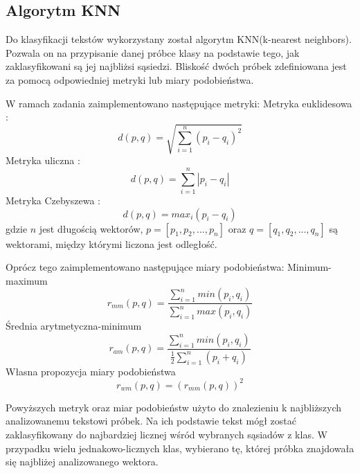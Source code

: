 \documentclass{classrep}
\begin{document}
\subsection{Algorytm KNN}
Do klasyfikacji tekstów wykorzystany został algorytm KNN(k-nearest neighbors). Pozwala on na przypisanie danej próbce klasy na podstawie tego, jak zaklasyfikowani są jej najbliżsi sąsiedzi. Bliskość dwóch próbek zdefiniowana jest za pomocą odpowiedniej metryki lub miary podobieństwa. \cite{KNNWiki}

W ramach zadania zaimplementowano następujące metryki: \newline
Metryka euklidesowa \cite{ANiewSkrypt}:
\begin{equation}
d(p,q) = \sqrt{\sum_{i=1}^{n} (p_{i} -q_{i})^{2}} 
\end{equation}
Metryka uliczna \cite{ANiewSkrypt}:
\begin{equation}
d(p,q) = \sum_{i=1}^{n} |p_{i} -q_{i}| 
\end{equation}
Metryka Czebyszewa \cite{ChebyshevWiki}:
\begin{equation}
d(p,q) = max_{i}(p_{i} -q_{i}) 
\end{equation}
gdzie \(n\) jest długością wektorów, \(p = [p_{1}, p_{2}, ..., p_{n}]\) oraz \(q = [q_{1}, q_{2}, ..., q_{n}]\) są wektorami, między którymi liczona jest odległość. 

Oprócz tego zaimplementowano następujące miary podobieństwa: \newline
Minimum-maximum \cite{ANiewSkrypt}
\begin{equation}
r_{mm}(p,q) = \frac{\sum_{i=1}^{n}min(p_{i},q_{i})}{\sum_{i=1}^{n}max(p_{i},q_{i})} 
\end{equation}
Średnia arytmetyczna-minimum \cite{ANiewSkrypt}
\begin{equation}
r_{am}(p,q) = \frac{\sum_{i=1}^{n}min(p_{i},q_{i})}{\frac{1}{2}\sum_{i=1}^{n}(p_{i}+q_{i})} 
\end{equation}
Własna propozycja miary podobieństwa
\begin{equation}
r_{wm}(p,q) = (r_{mm}(p,q))^{2}
\end{equation}

Powyższych metryk oraz miar podobieństw użyto do znalezieniu k najbliższych analizowanemu tekstowi próbek. Na ich podstawie tekst mógł zostać zaklasyfikowany do najbardziej licznej wśród wybranych sąsiadów z klas. W przypadku wielu jednakowo-licznych klas, wybierano tę, której próbka znajdowała się najbliżej analizowanego wektora.
\end{document}
